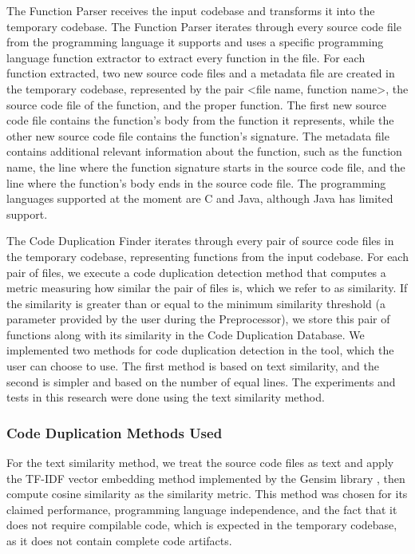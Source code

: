 \documentclass[conference]{IEEEtran}
\begin{document}
The Function Parser receives the input codebase and transforms it into the temporary
codebase. The Function Parser iterates through every source code file from the programming 
language it supports and uses a specific programming language function extractor
to extract every function in the file. For each function extracted, two new source code files
and a metadata file are created in the temporary codebase, represented by the pair <file
name, function name>, the source code file of the function, and the proper function.
The first new source code file contains the function’s body from the function it represents,
while the other new source code file contains the function’s signature. The metadata file
contains additional relevant information about the function, such as the function name,
the line where the function signature starts in the source code file, and the line where the
function’s body ends in the source code file. The programming languages supported at
the moment are C and Java, although Java has limited support.

The Code Duplication Finder iterates through every pair of source code files in the
temporary codebase, representing functions from the input codebase. For each pair of
files, we execute a code duplication detection method that computes a metric measuring
how similar the pair of files is, which we refer to as similarity. If the similarity is greater
than or equal to the minimum similarity threshold (a parameter provided by the user
during the Preprocessor), we store this pair of functions along with its similarity in the
Code Duplication Database. 
We implemented two methods for code duplication detection in the tool, which the user
can choose to use. The first method is based on text similarity, and the second is simpler
and based on the number of equal lines. The experiments and tests in this research were
done using the text similarity method.

\subsubsection{Code Duplication Methods Used}

For the text similarity method, we treat the source code files as text and apply the
TF-IDF vector embedding method implemented by the Gensim library \cite{gensim},
then compute cosine similarity as the similarity metric. This method was chosen for 
its claimed performance, programming language independence, and the fact that it does 
not require compilable code, which is expected in the
temporary codebase, as it does not contain complete code artifacts.
\end{document}
